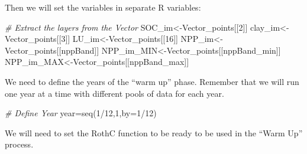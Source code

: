 \documentclass[
  10pt,
  b5paper,
]{book}
\newenvironment{Shaded}{\begin{snugshade}}{\end{snugshade}}
\newcommand{\AttributeTok}[1]{\textcolor[rgb]{0.77,0.63,0.00}{#1}}
\newcommand{\CommentTok}[1]{\textcolor[rgb]{0.56,0.35,0.01}{\textit{#1}}}
\newcommand{\DecValTok}[1]{\textcolor[rgb]{0.00,0.00,0.81}{#1}}
\newcommand{\FunctionTok}[1]{\textcolor[rgb]{0.00,0.00,0.00}{#1}}
\newcommand{\NormalTok}[1]{#1}
\newcommand{\OtherTok}[1]{\textcolor[rgb]{0.56,0.35,0.01}{#1}}
\newcommand{\SpecialCharTok}[1]{\textcolor[rgb]{0.00,0.00,0.00}{#1}}
\begin{document}
Then we will set the variables in separate R variables:

\begin{Shaded}
\begin{Highlighting}[]
\CommentTok{\# Extract the layers from the Vector}
\NormalTok{SOC\_im}\OtherTok{\textless{}{-}}\NormalTok{Vector\_points[[}\DecValTok{2}\NormalTok{]] }
\NormalTok{clay\_im}\OtherTok{\textless{}{-}}\NormalTok{Vector\_points[[}\DecValTok{3}\NormalTok{]] }
\NormalTok{LU\_im}\OtherTok{\textless{}{-}}\NormalTok{Vector\_points[[}\DecValTok{16}\NormalTok{]]}
\NormalTok{NPP\_im}\OtherTok{\textless{}{-}}\NormalTok{Vector\_points[[nppBand]]}
\NormalTok{NPP\_im\_MIN}\OtherTok{\textless{}{-}}\NormalTok{Vector\_points[[nppBand\_min]]}
\NormalTok{NPP\_im\_MAX}\OtherTok{\textless{}{-}}\NormalTok{Vector\_points[[nppBand\_max]]}
\end{Highlighting}
\end{Shaded}

We need to define the years of the ``warm up'' phase. Remember that we will run one year at a time with different pools of data for each year.

\begin{Shaded}
\begin{Highlighting}[]
\CommentTok{\# Define Year }
\NormalTok{year}\OtherTok{=}\FunctionTok{seq}\NormalTok{(}\DecValTok{1}\SpecialCharTok{/}\DecValTok{12}\NormalTok{,}\DecValTok{1}\NormalTok{,}\AttributeTok{by=}\DecValTok{1}\SpecialCharTok{/}\DecValTok{12}\NormalTok{)}
\end{Highlighting}
\end{Shaded}

We will need to set the RothC function to be ready to be used in the ``Warm Up'' process.
\end{document}
